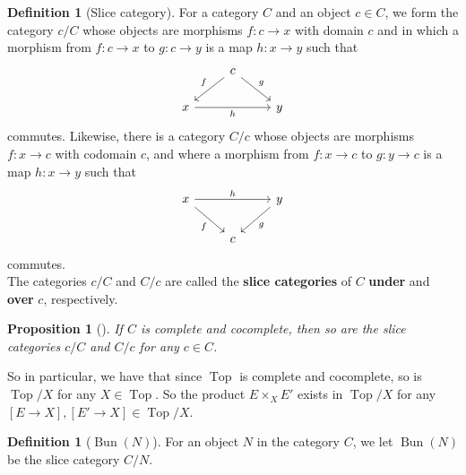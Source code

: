 \documentclass[reqno]{amsart}
\newtheorem{proposition}[theorem]{Proposition}
\theoremstyle{definition}
\newtheorem{definition}[theorem]{Definition}
\theoremstyle{remark}
\DeclareMathOperator{\Top}{Top}
\DeclareMathOperator{\Bun}{Bun}
\begin{document}
    \begin{definition}[Slice category]
        For a category $C$ and an object
        $c \in C$, we form the category
        $c / C$ whose objects are morphisms
        $f \colon c \to x$ with domain
        $c$ and in which a morphism from
        $f \colon c \to x$ to $g \colon c\to y$ is a
        map $h \colon x\to y$ such that
        \begin{equation*}
        \begin{tikzcd}
            & c \ar[dl, "f"'] \ar[dr, "g"] &\\
            x \ar[rr, "h"'] & & y
        \end{tikzcd}
        \end{equation*}
        commutes.
        Likewise, there is a category
        $C / c$ whose objects are morphisms
        $f \colon x \to c$ with codomain $c$, and
        where a morphism from $f \colon x\to c$ to
        $g \colon y \to c$ is a map
        $h \colon x\to y$ such that
        \begin{equation*}
        \begin{tikzcd}
            x \ar[rr, "h"] \ar[dr, "f"'] && y \ar[dl, "g"]\\
                                        & c&
        \end{tikzcd}
        \end{equation*}
        commutes.\\
        The categories 
        $c / C$ and $C / c$ are called the 
        \textbf{slice categories} of $C$ 
        \textbf{under} and \textbf{over} $c$, respectively.
    \end{definition}
    
    \begin{proposition}[\cite{Riehl}]
        If $C$ is complete and cocomplete, then so
        are the slice categories
        $c / C$ and $C / c$ for any $c \in C$.
    \end{proposition}

    So in particular, we have that since
    $\Top$ is complete and cocomplete, so
    is $\Top /X$ for any $X \in \Top$.
    So the product
    $E \times_X E'$ exists in $\Top / X$ for any
    $\left[ E \to X \right] ,
    \left[ E' \to X \right] \in \Top /X$.


    \begin{definition}[$\Bun(N)$]
        For an object $N$ in the category
        $C$, we let
        $\Bun(N)$ be the slice category
        $C / N$.
    \end{definition}
\end{document}
